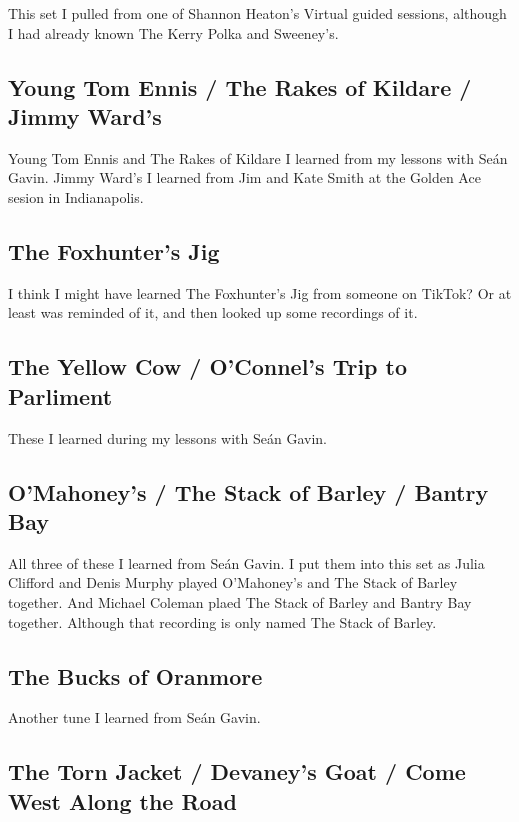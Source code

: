 \documentclass[11pt,letterpaper]{article}
\begin{document}
This set I pulled from one of Shannon Heaton's Virtual guided sessions, although I had already known The Kerry Polka and Sweeney's. 

\subsection*{Young Tom Ennis / The Rakes of Kildare / Jimmy Ward's}

Young Tom Ennis and The Rakes of Kildare I learned from my lessons with Se\'an Gavin. Jimmy Ward's I learned from Jim and Kate Smith at the Golden Ace sesion in Indianapolis.

\subsection*{The Foxhunter's Jig}

I think I might have learned The Foxhunter's Jig from someone on TikTok? Or at least was reminded of it, and then looked up some recordings of it.

\subsection*{The Yellow Cow / O'Connel's Trip to Parliment}

These I learned during my lessons with Se\'an Gavin.

\subsection*{O'Mahoney's / The Stack of Barley / Bantry Bay}

All three of these I learned from Se\'an Gavin. I put them into this set as Julia Clifford and Denis Murphy played O'Mahoney's and The Stack of Barley together. And Michael Coleman plaed The Stack of Barley and Bantry Bay together. Although that recording is only named The Stack of Barley.

\subsection*{The Bucks of Oranmore}

Another tune I learned from Se\'an Gavin.

\subsection*{The Torn Jacket / Devaney's Goat / Come West Along the Road}
\end{document}
